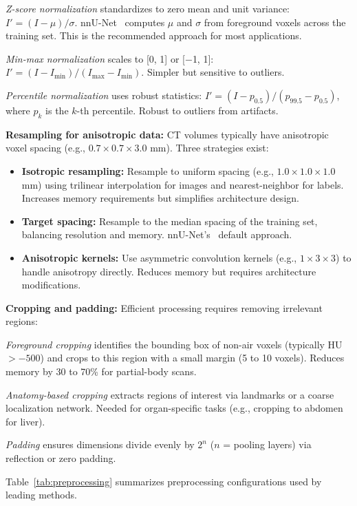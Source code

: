 \emph{Z-score normalization} standardizes to zero mean and unit variance: $I' = (I - \mu) / \sigma$. nnU-Net~\cite{isensee2021nnunet} computes $\mu$ and $\sigma$ from foreground voxels across the training set. This is the recommended approach for most applications.

\emph{Min-max normalization} scales to [0, 1] or [$-$1, 1]: $I' = (I - I_{\min}) / (I_{\max} - I_{\min})$. Simpler but sensitive to outliers.

\emph{Percentile normalization} uses robust statistics: $I' = (I - p_{0.5}) / (p_{99.5} - p_{0.5})$, where $p_k$ is the $k$-th percentile. Robust to outliers from artifacts.

\textbf{Resampling for anisotropic data:} CT volumes typically have anisotropic voxel spacing (e.g., $0.7 \times 0.7 \times 3.0$ mm). Three strategies exist:

\begin{itemize}
    \item \textbf{Isotropic resampling:} Resample to uniform spacing (e.g., $1.0 \times 1.0 \times 1.0$ mm) using trilinear interpolation for images and nearest-neighbor for labels. Increases memory requirements but simplifies architecture design.
    \item \textbf{Target spacing:} Resample to the median spacing of the training set, balancing resolution and memory. nnU-Net's~\cite{isensee2021nnunet} default approach.
    \item \textbf{Anisotropic kernels:} Use asymmetric convolution kernels (e.g., $1 \times 3 \times 3$) to handle anisotropy directly. Reduces memory but requires architecture modifications.
\end{itemize}

\textbf{Cropping and padding:} Efficient processing requires removing irrelevant regions:

\emph{Foreground cropping} identifies the bounding box of non-air voxels (typically HU $> -500$) and crops to this region with a small margin (5 to 10 voxels). Reduces memory by 30 to 70\% for partial-body scans.

\emph{Anatomy-based cropping} extracts regions of interest via landmarks or a coarse localization network. Needed for organ-specific tasks (e.g., cropping to abdomen for liver).

\emph{Padding} ensures dimensions divide evenly by $2^n$ ($n$ = pooling layers) via reflection or zero padding.

Table~\ref{tab:preprocessing} summarizes preprocessing configurations used by leading methods.


